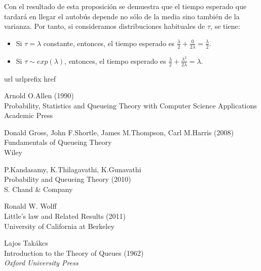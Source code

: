 \documentclass[a4paper,10pt]{scrartcl}
\theoremstyle{definition}
\numberwithin{equation}{section}
\begin{document}
	Con el resultado de esta proposición se demuestra que el tiempo esperado que tardará en llegar el autobús depende no sólo de la media sino también de la varianza. Por tanto, si consideramos distribuciones habituales de $\tau$, se tiene:
	\begin{itemize}
		\item Si $\tau=\lambda$ constante, entonces, el tiempo esperado es $\frac{\lambda}{2} + \frac{0}{2\lambda} = \frac{\lambda}{2}$.
		\item Si $\tau \sim exp(\lambda)$, entonces, el tiempo esperado es $\frac{\lambda}{2} + \frac{\lambda^2}{2\lambda} = \lambda$.
	\end{itemize}
	
	
	\newpage
	\begin{thebibliography}{10}
		\expandafter\ifx\csname url\endcsname\relax
		\def\url#1{\texttt{#1}}\fi
		\expandafter\ifx\csname urlprefix\endcsname\relax\def\urlprefix{URL }\fi
		\expandafter\ifx\csname href\endcsname\relax
		\def\href#1#2{#2} \def\path#1{#1}\fi
		
		Arnold O.Allen (1990)\\
		Probability, Statistics and Queueing Theory with Computer Science Applications\\
		Academic Press
		
		Donald Gross, John F.Shortle, James M.Thompson, Carl M.Harris (2008)\\
		Fundamentals of Queueing Theory\\
		Wiley
		
		P.Kandasamy, K.Thilagavathi, K.Gunavathi\\
		Probability and Queueing Theory (2010)\\
		S. Chand \& Company
		
		Ronald W. Wolff\\
		Little's law and Related Results (2011)\\
		University of California at Berkeley

                 Lajos Takákcs\\
                \newblock Introduction to the Theory of Queues (1962)\\
                \newblock \emph{Oxford University Press}
	\end{thebibliography}
	
\end{document}
